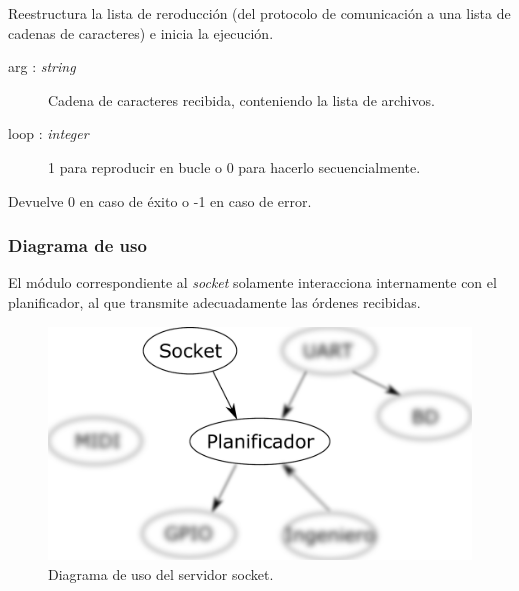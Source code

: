 \begin{description}[style=nextline]
	\item[socket\_play (arg, loop) : \textit{integer}]
	Reestructura la lista de reroducción (del protocolo de comunicación a una lista de cadenas de caracteres) e inicia la ejecución.
	
	\begin{description}
		\item[arg : \textit{string}] Cadena de caracteres recibida, conteniendo la lista de archivos.
		\item[loop : \textit{integer}] 1 para reproducir en bucle o 0 para hacerlo secuencialmente.
	\end{description}
	
	Devuelve 0 en caso de éxito o -1 en caso de error.
	
\end{description}

\subsubsection{Diagrama de uso}

El módulo correspondiente al \textit{socket} solamente interacciona internamente con el planificador, al que transmite adecuadamente las órdenes recibidas.

\smallskip

\begin{figure}[H]
	\noindent \begin{centering}
		\includegraphics[width=\linewidth/2]{capitulo4/daemon_socket}
		\par\end{centering}
	\smallskip
	\caption{\label{fig:daemon_socket} Diagrama de uso del servidor socket.}
\end{figure} 

